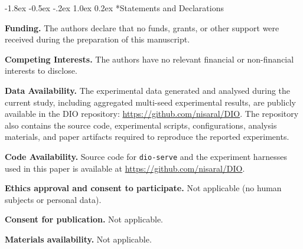 \documentclass[pdflatex,sn-mathphys-num]{sn-jnl}
\makeatletter
\renewcommand{\section}{\@startsection{section}{1}{\z@}%
  {-1.8ex \@plus -0.5ex \@minus -.2ex}%
  {1.0ex \@plus 0.2ex}%
  {\normalfont\large\bfseries}}%
\makeatother
\begin{document}
\clearpage
\section*{Statements and Declarations}

\noindent\textbf{Funding.}
The authors declare that no funds, grants, or other support were received during
the preparation of this manuscript.

\medskip
\noindent\textbf{Competing Interests.}
The authors have no relevant financial or non-financial interests to disclose.

\medskip
\noindent\textbf{Data Availability.}
The experimental data generated and analysed during the current study, including
aggregated multi-seed experimental results, are publicly available in the DIO
repository: \url{https://github.com/nisaral/DIO}.
The repository also contains the source code, experimental scripts, configurations,
analysis materials, and paper artifacts required to reproduce the reported
experiments.

\medskip
\noindent\textbf{Code Availability.}
Source code for \texttt{dio-serve} and the experiment harnesses used in this paper
is available at \url{https://github.com/nisaral/DIO}.

\medskip
\noindent\textbf{Ethics approval and consent to participate.}
Not applicable (no human subjects or personal data).

\medskip
\noindent\textbf{Consent for publication.}
Not applicable.

\medskip
\noindent\textbf{Materials availability.}
Not applicable.


%
\end{document}
